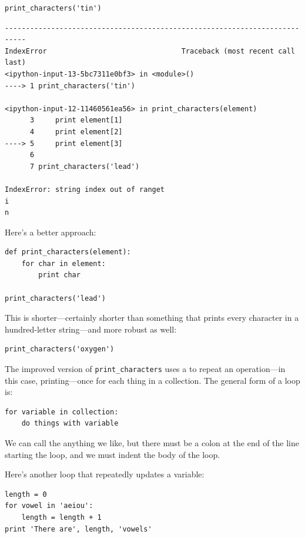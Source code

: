 \documentclass{book}
\begin{document}
\begin{verbatim}
print_characters('tin')
\end{verbatim}

\begin{verbatim}
---------------------------------------------------------------------------
IndexError                                Traceback (most recent call last)
<ipython-input-13-5bc7311e0bf3> in <module>()
----> 1 print_characters('tin')

<ipython-input-12-11460561ea56> in print_characters(element)
      3     print element[1]
      4     print element[2]
----> 5     print element[3]
      6
      7 print_characters('lead')

IndexError: string index out of ranget
i
n
\end{verbatim}

Here's a better approach:

\begin{verbatim}
def print_characters(element):
    for char in element:
        print char

print_characters('lead')
\end{verbatim}

This is shorter---certainly shorter than something that prints every
character in a hundred-letter string---and more robust as well:

\begin{verbatim}
print_characters('oxygen')
\end{verbatim}

The improved version of \texttt{print\_characters} uses a
 to repeat an operation---in this case,
printing---once for each thing in a collection. The general form of a
loop is:

\begin{verbatim}
for variable in collection:
    do things with variable
\end{verbatim}

We can call the  anything we
like, but there must be a colon at the end of the line starting the
loop, and we must indent the body of the loop.

Here's another loop that repeatedly updates a variable:

\begin{verbatim}
length = 0
for vowel in 'aeiou':
    length = length + 1
print 'There are', length, 'vowels'
\end{verbatim}
\end{document}
